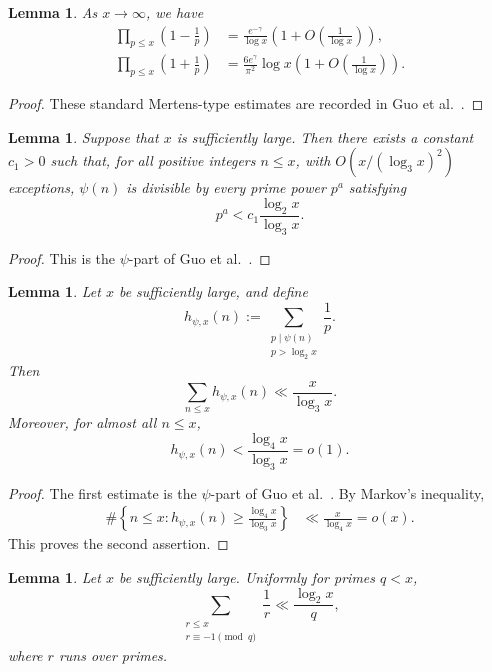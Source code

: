 \documentclass{article}
\newtheorem{lemma}[theorem]{Lemma}
\theoremstyle{remark}
\begin{document}
\begin{lemma}\label{sieve1-lemma}
As $x\to\infty$, we have
\begin{align}
    \prod_{p \leq x} \left(1 - \frac{1}{p}\right) 
    &= \frac{e^{-\gamma}}{\log x} \left(1 + O\left(\frac{1}{\log x}\right)\right),
    \label{3}
     \\
    \prod_{p \leq x} \left(1 + \frac{1}{p}\right) 
    &= \frac{6e^{\gamma}}{\pi^2} \log x \left(1 + O\left(\frac{1}{\log x}\right)\right).
    \label{4}
\end{align}
\end{lemma}

\begin{proof}
These standard Mertens-type estimates are recorded in
Guo et al.~\cite{Guo}.
\end{proof}
 

\begin{lemma}\label{div-lemma}
Suppose that \(x\) is sufficiently large. Then there exists
a constant \(c_1>0\) such that, for all positive integers \(n\le x\),
with \(O(x/(\log_3x)^2)\) exceptions, \(\psi(n)\) is divisible by every
prime power \(p^a\) satisfying
\[
p^a<c_1\frac{\log_2x}{\log_3x}.
\]
\end{lemma}

\begin{proof}
This is the \(\psi\)-part of
Guo et al.~\cite[Lemma~2.3]{Guo}.
\end{proof}



\begin{lemma}\label{hpsi-lemma}
Let \(x\) be sufficiently large, and define
\[
h_{\psi,x}(n)
:=
\sum_{\substack{p\mid\psi(n)\\p>\log_2x}}\frac1p.
\]
Then
\[
\sum_{n\le x}h_{\psi,x}(n)
\ll
\frac{x}{\log_3x}.
\]
Moreover, for almost all \(n\le x\),
\[
h_{\psi,x}(n)
<
\frac{\log_4x}{\log_3x}
=o(1).
\]
\end{lemma}

\begin{proof}
The first estimate is the \(\psi\)-part of
Guo et al.~\cite[Lemma~2.5]{Guo}. By Markov's inequality,
\[
\begin{aligned}
\#\left\{n\le x:
h_{\psi,x}(n)\ge
\frac{\log_4x}{\log_3x}\right\}
&\ll
\frac{x}{\log_4x}
=o(x).
\end{aligned}
\]
This proves the second assertion.
\end{proof}


\begin{lemma}\label{BT-lemma}
Let \(x\) be sufficiently large. Uniformly for primes \(q<x\),
\[
\sum_{\substack{r\le x\\r\equiv-1\pmod q}}
\frac1r
\ll
\frac{\log_2x}{q},
\]
where \(r\) runs over primes.
\end{lemma}
\end{document}
